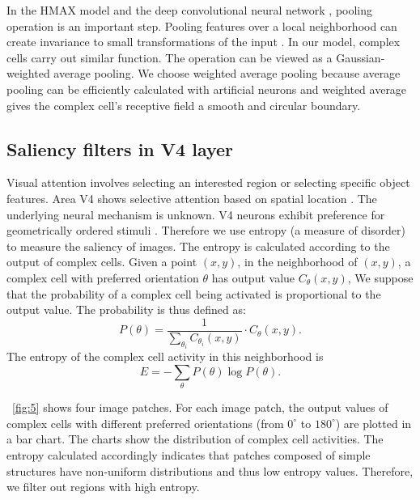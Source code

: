 \documentclass[10pt]{article}
\begin{document}
In the HMAX model \cite{riesenhuber1999} and the deep convolutional neural network \cite{krizhevsky2012}, pooling operation is an important step.
Pooling features over a local neighborhood can create invariance to small transformations of the input \cite{boureau2010}.
In our model, complex cells carry out similar function.
The operation can be viewed as a Gaussian-weighted average pooling.
We choose weighted average pooling because average pooling can be efficiently calculated with artificial neurons
and weighted average gives the complex cell's receptive field a smooth and circular boundary.  

\subsection{Saliency filters in V4 layer}

Visual attention involves selecting an interested region or selecting specific object features.
Area V4 shows selective attention based on spatial location \cite{desimone1995}.
The underlying neural mechanism is unknown.
V4 neurons exhibit preference for geometrically ordered stimuli \cite{sasaki2005}.
Therefore we use entropy (a measure of disorder) to measure the saliency of images.
The entropy is calculated according to the output of complex cells.
Given a point $(x,y)$, in the neighborhood of $(x,y)$,
a complex cell with preferred orientation $\theta$ has output value $C_{\theta}(x,y)$,
We suppose that the probability of a complex cell being activated is proportional to the output value.
The probability is thus defined as:
\begin{equation}
P(\theta)=\frac{1}{\sum_{\theta_i} C_{\theta_i}(x,y)}\cdot C_{\theta}(x,y).
\end{equation}
The entropy of the complex cell activity in this neighborhood is 
\begin{equation}
E=-\sum_{\theta} P(\theta) \log P(\theta).
\end{equation}

\figurename~\ref{fig:5} shows four image patches.
For each image patch, the output values of complex cells with different preferred orientations (from $0^\circ$ to $180^\circ$) are plotted in a bar chart.
The charts show the distribution of complex cell activities.
The entropy calculated accordingly indicates that patches composed of simple structures have non-uniform distributions and thus low entropy values.
Therefore, we filter out regions with high entropy.
\end{document}
